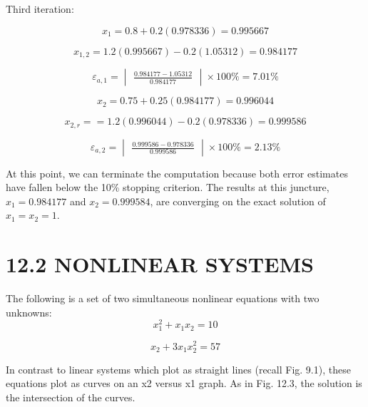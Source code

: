 \documentclass[../main.tex]{subfiles}
\begin{document}
Third iteration:

\begin{equation}
x_{1}=0.8+0.2(0.978336)=0.995667
\end{equation}

\begin{equation}
x_{1,2}=1.2(0.995667) - 0.2(1.05312) = 0.984177
\end{equation}

\begin{equation}
\varepsilon_{a,1}=\begin{vmatrix}
\frac{0.984177-1.05312}{0.984177}
\end{vmatrix} \times 100\% = 7.01\%
\end{equation}

\begin{equation}
x_{2}=0.75 + 0.25(0.984177) = 0.996044
\end{equation}

\begin{equation}
x_{2,r}== 1.2(0.996044)-0.2(0.978336) = 0.999586
\end{equation}

\begin{equation}
\varepsilon_{a,2} = \begin{vmatrix} \frac{0.999586-0.978336}{0.999586}
\end{vmatrix} \times 100\%= 2.13\%
\end{equation}

At this point, we can terminate the computation because both error estimates have fallen
below the 10\% stopping criterion. The results at this juncture, $x_{1}=0.984177$ and
$x_{2}=0.999584$, are converging on the exact solution of $x_{1}=x_{2}=1$.


\section*{12.2 NONLINEAR SYSTEMS}

The following is a set of two simultaneous nonlinear equations with two unknowns:
\begin{equation}
x_{1}^{2}+x_{1}x_{2}=10
\tag{12.6a}
\end{equation}

\begin{equation}
x_{2}+3x_{1}x_{2}^{2}=57
\end{equation}

In contrast to linear systems which plot as straight lines (recall Fig. 9.1), these equations
plot as curves on an x2 versus x1 graph. As in Fig. 12.3, the solution is the intersection of
the curves.
\end{document}
